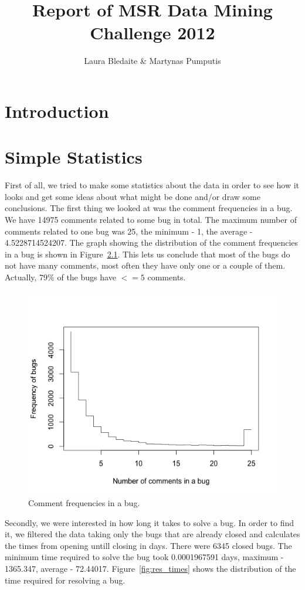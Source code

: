 \documentclass[a4paper,11pt]{report}
\begin{document}
\title{Report of MSR Data Mining Challenge 2012}
\author{Laura Bledaite \& Martynas Pumputis}
\maketitle
\tableofcontents
\chapter{Introduction}
\chapter{Simple Statistics}
First of all, we tried to make some statistics about the data in order to see how it looks and get some ideas about what might be done and/or draw some conclusions.
The first thing we looked at was the comment frequencies in a bug. We have 14975 comments related to some bug in total. The maximum number of comments related to one bug was 25, the minimum - 1, the average - 4.5228714524207. The graph showing the distribution of the comment frequencies in a bug is shown in Figure~\ref{fig:com_freq}. This lets us conclude that most of the bugs do not have many comments, most often they have only one or a couple of them. Actually, 79\% of the bugs have $<=5$ comments.

\begin{figure}[ht!]
\centering
\includegraphics[width=.7\textwidth]{diagrams/comment_frequencies.png}
\caption{Comment frequencies in a bug.}
\label{fig:com_freq}
\end{figure}

Secondly, we were interested in how long it takes to solve a bug. In order to find it, we filtered the data taking only the bugs that are already closed and calculates the times from opening untill closing in days. There were 6345 closed bugs. The minimum time required to solve the bug took 0.0001967591 days, maximum - 1365.347, average - 72.44017. Figure~\ref{fig:res_times} shows the distribution of the time required for resolving a bug.
\end{document}
